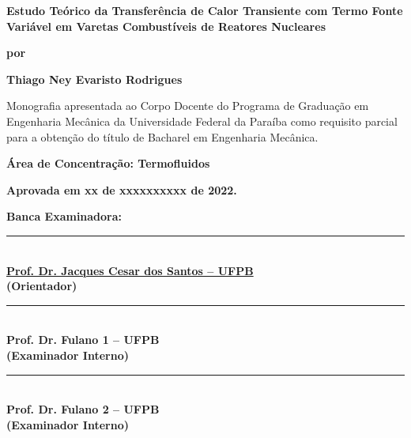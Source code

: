 \thispagestyle{empty}

\begin{center}
    {\Large
    \textbf{Estudo Teórico da Transferência de Calor Transiente com Termo Fonte Variável em Varetas Combustíveis de Reatores Nucleares}}
    
    \vspace{1.0cm}
    
    \textbf{por}
    
    \vspace{1.0cm}
    
    {\large
    \bf{Thiago Ney Evaristo Rodrigues}}
\end{center}

\vspace{1.0cm}

Monografia apresentada ao Corpo Docente do Programa de
Graduação em Engenharia Mecânica da Universidade Federal da Paraíba
como requisito parcial para a obtenção do título de Bacharel em
Engenharia Mecânica.

\vspace{1.0cm}

\noindent \textbf{Área de Concentração: Termofluidos}

\vspace{1.0cm}

\noindent \textbf{Aprovada em xx de xxxxxxxxxx de 2022.}

\vspace{1.0cm}

\noindent \textbf{Banca Examinadora:}

\vspace{0.7cm}

\begin{center}
 
     \rule{10cm}{.1mm} \\
     \href{http://lattes.cnpq.br/3095303507056273}
     {\textbf{Prof. Dr. Jacques Cesar dos Santos -- UFPB}} \\
     \textbf{(Orientador)}
     
     \vspace{1cm}
     
     \rule{10cm}{.1mm} \\
     {\textbf{Prof. Dr. Fulano 1 -- UFPB}} \\
     \textbf{(Examinador Interno)}
     
     \vspace{1cm}
    
     \rule{10cm}{.1mm} \\
     {\textbf{Prof. Dr. Fulano 2  -- UFPB}} \\
     \textbf{(Examinador Interno)}

\end{center}